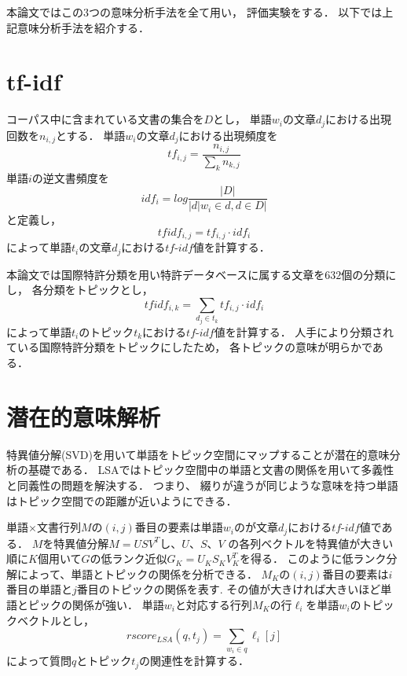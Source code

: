 \documentclass[master]{suribt}
\theoremstyle{definition}
\begin{document}
 本論文ではこの3つの意味分析手法を全て用い，
 評価実験をする．
 以下では上記意味分析手法を紹介する．

 \section{tf-idf}
 コーパス中に含まれている文書の集合を$D$とし，
 単語$w_i$の文章$d_j$における出現回数を$n_{i,j}$とする．
 単語$w_i$の文章$d_j$における出現頻度を
 \begin{equation}
 tf_{i,j} = \frac{n_{i,j}}{\sum_k n_{k,j}}
 \end{equation}
 単語$i$の逆文書頻度を
 \begin{equation}
 idf_i = log \frac{|D|}{|d|w_i \in d, d \in D|}
 \end{equation}
 と定義し，
 \begin{equation}
 tfidf_{i,j} = tf_{i,j} \cdot idf_i
 \end{equation}
 によって単語$t_i$の文章$d_j$における$tf\text{-}idf$値を計算する．
 
 本論文では国際特許分類を用い特許データベースに属する文章を$632$個の分類にし，
 各分類をトピックとし，
 \begin{equation}
 tfidf_{i,k} = \sum_{d_j \in t_k}tf_{i,j} \cdot idf_i
 \end{equation}
 によって単語$t_i$のトピック$t_k$における$tf\text{-}idf$値を計算する．
 人手により分類されている国際特許分類をトピックにしたため，
 各トピックの意味が明らかである．

 \section{潜在的意味解析}
 特異値分解(SVD)を用いて単語をトピック空間にマップすることが潜在的意味分析の基礎である．
 LSAではトピック空間中の単語と文書の関係を用いて多義性と同義性の問題を解決する．
 つまり、 綴りが違うが同じような意味を持つ単語はトピック空間での距離が近いようにできる．

 単語$\times$文書行列$M$の$(i,j)$番目の要素は単語$w_i$のが文章$d_j$における$tf\text{-}idf$値である．
 $M$を特異値分解$M = USV^T$し、$U$、$S$、$V$ の各列ベクトルを特異値が大きい順に$K$個用いて$G$の低ランク近似$G_K=U_KS_KV_{K}^T$を得る．
 このように低ランク分解によって、単語とトピックの関係を分析できる．
 $M_K$の$(i,j)$番目の要素は$i$番目の単語と$j$番目のトピックの関係を表す.
 その値が大きければ大きいほど単語とピックの関係が強い．
 単語$w_i$と対応する行列$M_K$の行$\ell_i$を単語$w_i$のトピックベクトルとし，
 \begin{equation}
 rscore_{LSA}(q,t_j) = \sum_{w_i \in q}\ell_i[j]
 \end{equation}
 によって質問$q$とトピック$t_j$の関連性を計算する．
 
\end{document}
